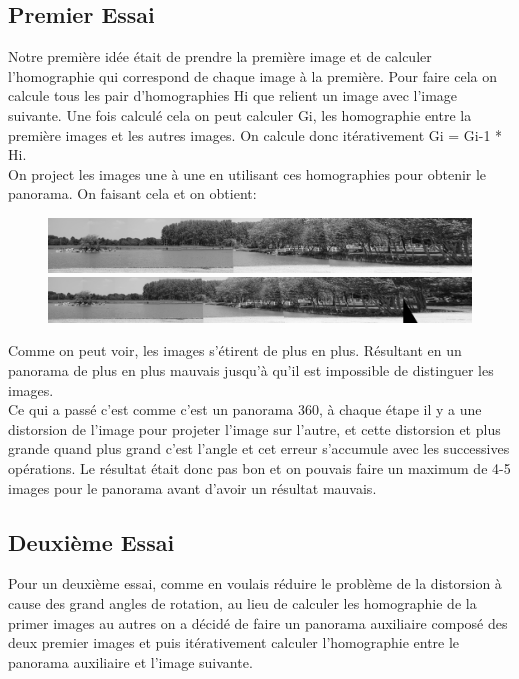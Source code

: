 \documentclass[11pt]{article}
\begin{document}
\subsection{Premier Essai}

Notre première idée était de prendre la première image et de calculer l’homographie qui correspond de chaque image à la première. Pour faire cela on calcule tous les pair d’homographies Hi que relient un image avec l’image suivante. Une fois calculé cela on peut calculer Gi, les homographie entre la première images et les autres images. On calcule donc itérativement Gi = Gi-1 * Hi. \\
On project les images une à une en utilisant ces homographies pour obtenir le panorama. On faisant cela et on obtient: 

\begin{figure}[H]
\centering
\includegraphics[width=.8\textwidth]{../resources/output/homography_panorama4.jpg}
\includegraphics[width=.8\textwidth]{../resources/output/homography_panorama5.jpg}
\end{figure}

Comme on peut voir, les images s’étirent de plus en plus. Résultant en un panorama de plus en plus mauvais jusqu’à qu’il est impossible de distinguer les images. \\
Ce qui a passé c’est comme c’est un panorama 360, à chaque étape il y a une distorsion de l’image pour projeter l’image sur l’autre, et cette distorsion et plus grande quand plus grand c’est l’angle et cet erreur s’accumule avec les successives opérations. Le résultat était donc pas bon et on pouvais faire un maximum de 4-5 images pour le panorama avant d’avoir un résultat mauvais.

\subsection{Deuxième Essai}

Pour un deuxième essai, comme en voulais réduire le problème de la distorsion à cause des grand angles de rotation, au lieu de calculer les homographie de la primer images au autres on a décidé de faire un panorama auxiliaire composé des deux premier images et puis itérativement calculer l’homographie entre le panorama auxiliaire et l’image suivante.
\end{document}
